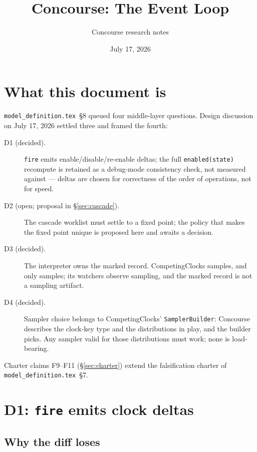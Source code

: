 \documentclass[11pt]{article}
\title{Concourse: The Event Loop}
\author{Concourse research notes}
\date{July 17, 2026}
\newcommand{\code}[1]{\texttt{#1}}
\begin{document}
\maketitle
\tableofcontents

\section{What this document is}

\code{model\_definition.tex}~\S8 queued four middle-layer questions. Design
discussion on July 17, 2026 settled three and framed the fourth:

\begin{description}
\item[D1 (decided).] \code{fire} emits enable/disable/re-enable deltas; the
  full \code{enabled(state)} recompute is retained as a debug-mode
  consistency check, not measured against --- deltas are chosen for
  correctness of the order of operations, not for speed.
\item[D2 (open; proposal in \S\ref{sec:cascade}).] The cascade worklist must
  settle to a fixed point; the policy that makes the fixed point unique is
  proposed here and awaits a decision.
\item[D3 (decided).] The interpreter owns the marked record. CompetingClocks
  samples, and only samples; its watchers observe sampling, and the marked
  record is not a sampling artifact.
\item[D4 (decided).] Sampler choice belongs to CompetingClocks'
  \code{SamplerBuilder}: Concourse describes the clock-key type and the
  distributions in play, and the builder picks. Any sampler valid for those
  distributions must work; none is load-bearing.
\end{description}

Charter claims F9--F11 (\S\ref{sec:charter}) extend the falsification
charter of \code{model\_definition.tex}~\S7.

\section{D1: \code{fire} emits clock deltas}
\label{sec:deltas}

\subsection{Why the diff loses}
\end{document}
